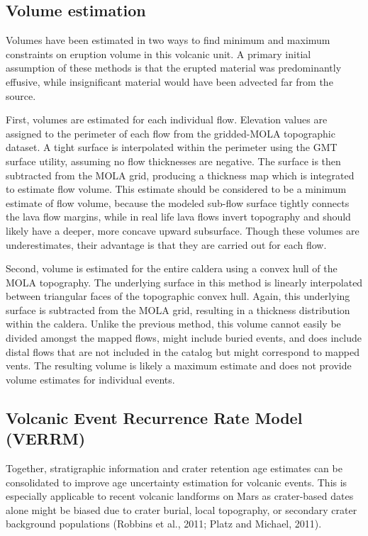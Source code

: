 \documentclass[12pt,letter]{article}
\begin{document}
\subsection{Volume estimation}
Volumes have been estimated in two ways to find minimum and maximum constraints on eruption volume in this volcanic unit. A primary initial assumption of these methods is that the erupted material was predominantly effusive, while insignificant material would have been advected far from the source.

First, volumes are estimated for each individual flow. Elevation values are assigned to the perimeter of each flow from the gridded-MOLA topographic dataset. A tight surface is interpolated within the perimeter using the GMT surface utility, assuming no flow thicknesses are negative. The surface is then subtracted from the MOLA grid, producing a thickness map which is integrated to estimate flow volume. This estimate should be considered to be a minimum estimate of flow volume, because the modeled sub-flow surface tightly connects the lava flow margins, while in real life lava flows invert topography and should likely have a deeper, more concave upward subsurface. Though these volumes are underestimates, their advantage is that they are carried out for each flow.

Second, volume is estimated for the entire caldera using a convex hull of the MOLA topography. The underlying surface in this method is linearly interpolated between triangular faces of the topographic convex hull. Again, this underlying surface is subtracted from the MOLA grid, resulting in a thickness distribution within the caldera. Unlike the previous method, this volume cannot easily be divided amongst the mapped flows, might include buried events, and does include distal flows that are not included in the catalog but might correspond to mapped vents. The resulting volume is likely a maximum estimate and does not provide volume estimates for individual events.

\subsection{Volcanic Event Recurrence Rate Model (VERRM)}

Together, stratigraphic information and crater retention age estimates can be consolidated to improve age uncertainty estimation for volcanic events. This is especially applicable to recent volcanic landforms on Mars as crater-based dates alone might be biased due to crater burial, local topography, or secondary crater background populations (Robbins et al., 2011; Platz and Michael, 2011).
\end{document}
